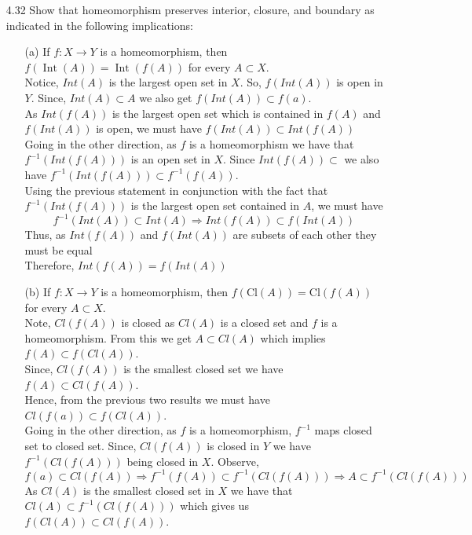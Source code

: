 \documentclass[12pt]{article}
\begin{document}
\begin{enumerate}
	\item[4.32] Show that homeomorphism preserves interior, closure, and boundary as indicated in the following implications:
	\begin{enumerate}
		\item[(a)] If $f : X \rightarrow Y$ is a homeomorphism, then $f ( \operatorname { Int } ( A ) ) = \operatorname { Int } ( f ( A ) )$ for every $A \subset X .$\\
		Notice, $ Int(A) $ is the largest open set in $ X $. So, $ f(Int(A)) $ is open in $ Y $. Since, $ Int(A) \subset A $ we also get $ f(Int(A)) \subset f(a) $. \\
		As $ Int(f(A)) $ is the largest open set which is contained in $ f(A) $ and $ f(Int(A)) $ is open, we must have $ f(Int(A))\subset Int(f(A)) $\\
		Going in the other direction, as $ f $ is a homeomorphism  we have that $ f^{-1}(Int(f(A))) $ is an open set in $ X $. Since $ Int(f(A)) \subset $ we also have $ f^{-1}(Int(f(A))) \subset f^{-1}(f(A)) $.\\
		 Using the previous statement in conjunction with the fact that $ f^{-1}(Int(f(A))) $ is the largest open set contained in $ A $, we must have
			 \[f^{-1}(Int(A))\subset Int(A) \Rightarrow Int(f(A)) \subset f(Int(A))\]
		Thus, as $ Int(f(A)) $ and $ f(Int(A)) $ are subsets of each other they must be equal\\
		Therefore, $ Int(f(A)) = f(Int(A)) $
		\item[(b)] If $f : X \rightarrow Y$ is a homeomorphism, then $f ( \mathrm { Cl } ( A ) ) = \mathrm { Cl } ( f ( A ) )$ for every $A \subset X .$\\
		Note, $ Cl(f(A)) $ is closed as $ Cl(A) $ is a closed set and $ f $ is a homeomorphism. From this we get $ A\subset Cl(A) $ which implies $ f(A) \subset f(Cl(A)) $.\\
		Since, $ Cl(f(A)) $ is the smallest closed set we have $ f(A)\subset Cl(f(A)) $.\\
		Hence, from the previous two results we must have $ Cl(f(a)) \subset f(Cl(A))$.\\
		Going in the other direction, as $ f $ is a homeomorphism, $ f^{-1} $ maps closed set to closed set. Since, $ Cl(f(A))  $ is closed in $ Y $ we have $ f^{-1}(Cl(f(A))) $ being closed in $ X $. Observe,
			\[f(a)\subset Cl(f(A)) \Rightarrow f^{-1}(f(A))\subset f^{-1}(Cl(f(A))) \Rightarrow A \subset f^{-1}(Cl(f(A))) \]
		As $ Cl(A) $ is the smallest closed set in $ X $ we have that $ Cl(A) \subset f^{-1}(Cl(f(A))) $ which gives us $ f(Cl(A)) \subset Cl(f(A)) $.\\

\end{enumerate}
\end{enumerate}
\end{document}
